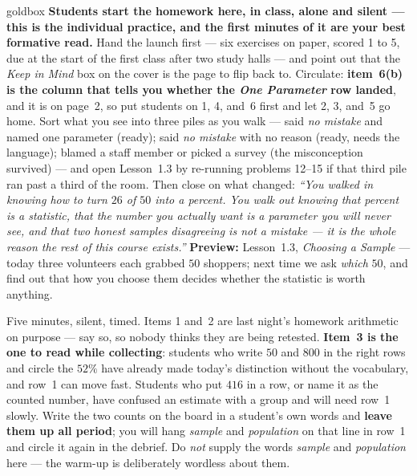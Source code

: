 \documentclass[10pt]{article}
\begin{document}
\boxguard
\begin{skillbox}{goldbox}
\textbf{Students start the homework here, in class, alone and silent --- this is the individual
practice, and the first minutes of it are your best formative read.} Hand the launch first ---
six exercises on paper, scored 1 to 5, due at the start of the first class after two study halls --- and point out that the
\emph{Keep in Mind} box on the cover is the page to flip back to. Circulate: \textbf{item~6(b)
is the column that tells you whether the \emph{One Parameter} row landed}, and it is on page~2, so put students
on 1, 4, and~6 first and let 2, 3, and~5 go home. Sort what you see into three piles as you
walk --- said \emph{no mistake} and named one parameter (ready); said \emph{no mistake} with
no reason (ready, needs the language); blamed a staff member or picked a survey (the
misconception survived) --- and open Lesson~1.3 by re-running problems 12--15 if that
third pile ran past a third of the room. Then close on what changed: \emph{``You walked in
knowing how to turn $26$ of $50$ into a percent. You walk out knowing that percent is a
statistic, that the number you actually want is a parameter you will never see, and that two
honest samples disagreeing is not a mistake --- it is the whole reason the rest of this course
exists.''} \textbf{Preview:} Lesson~1.3, \emph{Choosing a Sample} --- today three volunteers
each grabbed $50$ shoppers; next time we ask \emph{which} $50$, and find out that how you
choose them decides whether the statistic is worth anything.
\end{skillbox}

\begin{teachernote}[Warm-Up]
Five minutes, silent, timed. Items 1 and~2 are last night's homework arithmetic on purpose ---
say so, so nobody thinks they are being retested. \textbf{Item~3 is the one to read while
collecting}: students who write $50$ and $800$ in the right rows and circle the $52\%$ have
already made today's distinction without the vocabulary, and row~1 can move fast.
Students who put $416$ in a row, or name it as the counted number, have confused an estimate
with a group and will need row~1 slowly. Write the two counts on the board in a student's
own words and \textbf{leave them up all period}; you will hang \emph{sample} and
\emph{population} on that line in row~1 and circle it again in the debrief. Do \emph{not}
supply the words \emph{sample} and \emph{population} here --- the warm-up is deliberately
wordless about them.
\end{teachernote}
\end{document}
